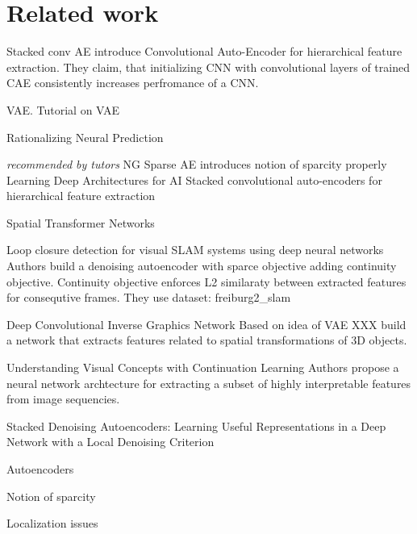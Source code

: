
\chapter{Related work}
\label{cha:rewo}
Stacked conv AE \cite{Masci2011} introduce Convolutional Auto-Encoder for hierarchical feature extraction.
They claim, that initializing CNN with convolutional layers of trained CAE consistently increases perfromance of a CNN.

VAE. Tutorial on VAE \cite{Doersch2016}

Rationalizing Neural Prediction \cite{Lei2016}


\textit{recommended by tutors}
NG Sparse AE  \cite{Ng2011} introduces notion of sparcity properly
Learning Deep Architectures for AI \cite{Bengio2009}
Stacked convolutional auto-encoders for hierarchical feature extraction \cite{Masci2011}

Spatial Transformer Networks \cite{Jaderberg2015}

Loop closure detection for visual SLAM systems using deep neural networks \cite{Gao2015}
Authors build a denoising autoencoder with sparce objective adding continuity objective.
Continuity objective enforces L2 similaraty between extracted features for consequtive frames.
They use dataset: freiburg2_slam

Deep Convolutional Inverse Graphics Network\cite{Kulkarni2015}
Based on idea of VAE XXX build a network that extracts features related to spatial transformations of 3D objects.

Understanding Visual Concepts with Continuation Learning \cite{Whitney2016}
Authors propose a neural network archtecture for extracting a subset of highly interpretable features
from image sequencies.

Stacked Denoising Autoencoders: Learning Useful Representations in a Deep Network with a Local Denoising Criterion \cite{VincentPASCALVINCENT2010}



Autoencoders


Notion of sparcity


Localization issues
